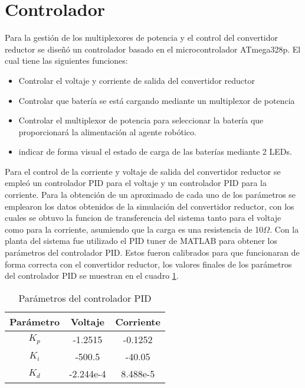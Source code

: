 \section{Controlador}
    \label{sec:controlador}
    Para la gestión de los multiplexores de potencia y el control del convertidor
    reductor se diseñó un controlador basado en el microcontrolador ATmega328p.
    El cual tiene las siguientes funciones:

    \begin{itemize}
        \item Controlar el voltaje y corriente de salida del convertidor reductor
        \item Controlar que batería se está cargando mediante un multiplexor de potencia
        \item Controlar el multiplexor de potencia para seleccionar la batería
        que proporcionará la alimentación al agente robótico.
        \item indicar de forma visual el estado de carga de las baterías mediante
        2 LEDs.
    \end{itemize}

    Para el control de la corriente y voltaje de salida del convertidor reductor
    se empleó un controlador PID para el voltaje y un controlador PID para la corriente.
    Para la obtención de un aproximado de cada uno de los parámetros se emplearon 
    los datos obtenidos de la simulación del convertidor reductor, con los cuales 
    se obtuvo la funcion de transferencia del sistema tanto para el voltaje como
    para la corriente, asumiendo que la carga es una resistencia de 10$\Omega$. Con
    la planta del sistema fue utilizado el PID tuner de MATLAB para obtener los
    parámetros del controlador PID. Estos fueron calibrados para que funcionaran 
    de forma correcta con el convertidor reductor, los valores finales de los
    parámetros del controlador PID se muestran en el cuadro \ref{tab:pid_parameters}.

    \begin{table}[H]
        \centering
        \begin{tabular}{|c|c|c|}
            \hline
            Parámetro & Voltaje & Corriente\\
            \hline
            $K_p$ & -1.2515 & -0.1252\\
            \hline
            $K_i$ & -500.5 & -40.05 \\
            \hline
            $K_d$ & -2.244e-4 & 8.488e-5 \\
            \hline
        \end{tabular}
        \caption{Parámetros del controlador PID}
        \label{tab:pid_parameters}
    \end{table}

